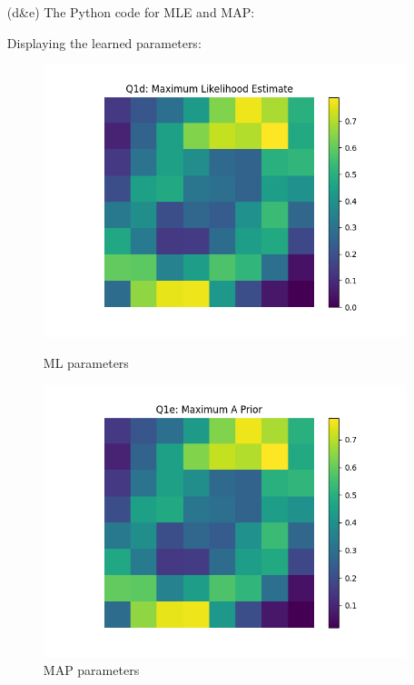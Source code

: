 \documentclass[12pt]{article}
\begin{document}
\begin{enumerate}
\newpage
\item[(d\&e)] The Python code for MLE and MAP:

\newpage

Displaying the learned parameters:
\begin{figure}[h]
\centering
\begin{minipage}{0.5\textwidth}
  \centering
  \includegraphics[scale=0.4]{outputs/q1/q1d}
  \caption{ML parameters}
  \label{fig:1d}
\end{minipage}%
\begin{minipage}{0.5\textwidth}
  \centering
  \includegraphics[scale=0.4]{outputs/q1/q1e}
  \caption{MAP parameters}
  \label{fig:1e}
\end{minipage}
\end{figure}


\end{enumerate}
\end{document}
